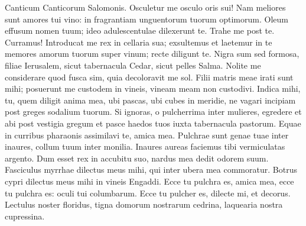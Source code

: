 \begin{biblechapter}
 \verse Canticum Canticorum Salomonis.
 \verse Osculetur me osculo oris sui!
 Nam meliores sunt amores tui vino:
 \verse in fragrantiam unguentorum tuorum optimorum.
 Oleum effusum nomen tuum;
 ideo adulescentulae dilexerunt te.
 \verse Trahe me post te. Curramus!
 Introducat me rex in cellaria sua;
 exsultemus et laetemur in te
 memores amorum tuorum super vinum;
 recte diligunt te.
 \verse Nigra sum sed formosa,
 filiae Ierusalem,
 sicut tabernacula Cedar,
 sicut pelles Salma.
 \verse Nolite me considerare quod fusca sim,
 quia decoloravit me sol.
 Filii matris meae irati sunt mihi;
 posuerunt me custodem in vineis,
 vineam meam non custodivi.
 \verse Indica mihi, tu, quem diligit anima mea,
 ubi pascas,
 ubi cubes in meridie,
 ne vagari incipiam
 post greges sodalium tuorum.
 \verse Si ignoras,
 o pulcherrima inter mulieres,
 egredere et abi post vestigia gregum
 et pasce haedos tuos
 iuxta tabernacula pastorum.
 \verse Equae in curribus pharaonis
 assimilavi te, amica mea.
 \verse Pulchrae sunt genae tuae inter inaures,
 collum tuum inter monilia.
 \verse Inaures aureas faciemus tibi
 vermiculatas argento.
 \verse Dum esset rex in accubitu suo,
 nardus mea dedit odorem suum.
 \verse Fasciculus myrrhae dilectus meus mihi,
 qui inter ubera mea commoratur.
 \verse Botrus cypri dilectus meus mihi
 in vineis Engaddi.
 \verse Ecce tu pulchra es, amica mea,
 ecce tu pulchra es:
 oculi tui columbarum.
 \verse Ecce tu pulcher es, dilecte mi,
 et decorus.
 Lectulus noster floridus,
 \verse tigna domorum nostrarum cedrina,
 laquearia nostra cupressina.
 

\end{biblechapter}
